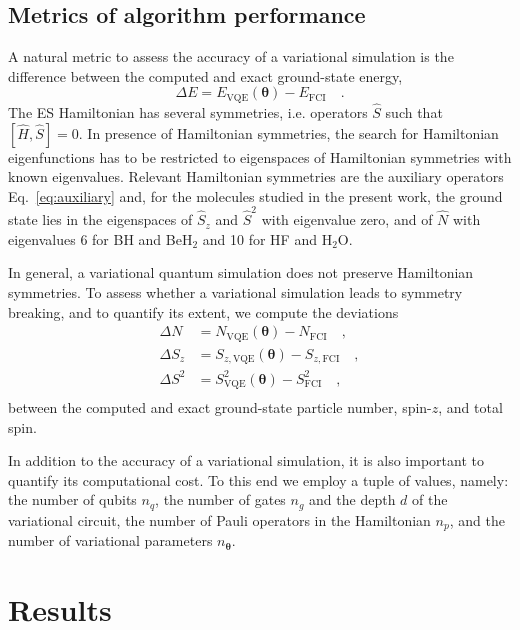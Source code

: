\documentclass[aps,pra,onecolumn]{revtex4-2}
\newcommand{\bgreek}[1]{{\boldsymbol{#1}}}
\begin{document}
\subsection{Metrics of algorithm performance}
\label{sec:metrics}

A natural metric to assess the accuracy of a variational simulation is the difference between the computed and exact ground-state energy, 
\begin{equation}
\Delta E = E_{\mathrm{VQE}}(\bgreek{\theta}) - E_{\mathrm{FCI}}
\quad .
\end{equation}
The ES Hamiltonian has several symmetries, i.e. operators $\hat{S}$ such that $[\hat{H},\hat{S}]=0$. 
In presence of Hamiltonian symmetries, the search for Hamiltonian eigenfunctions has to be restricted to eigenspaces of Hamiltonian symmetries with known eigenvalues.
Relevant Hamiltonian symmetries are the auxiliary operators Eq.~\eqref{eq:auxiliary}
and, for the molecules studied in the present work, the ground state lies in the eigenspaces of $\hat{S}_z$ and $\hat{S}^2$ with eigenvalue zero,
and of $\hat{N}$ with eigenvalues $6$ for BH and BeH$_2$ and 10 for HF and H$_2$O.

In general, a variational quantum simulation does not preserve Hamiltonian symmetries. To assess whether a variational simulation
leads to symmetry breaking, and to quantify its extent, we compute the deviations
\begin{equation}
\begin{split}
\Delta N &= N_{\mathrm{VQE}}(\bgreek{\theta}) - N_{\mathrm{FCI}} \quad, \\
\Delta S_z &= S_{z,\mathrm{VQE}}(\bgreek{\theta}) - S_{z,\mathrm{FCI}} \quad, \\
\Delta S^2 &= S^2_{\mathrm{VQE}}(\bgreek{\theta}) - S^2_{\mathrm{FCI}} \quad, \\
\end{split}
\end{equation}
between the computed and exact ground-state particle number, spin-$z$, and total spin.

In addition to the accuracy of a variational simulation, it is also important to quantify its computational cost. To this end we employ a tuple of values,
namely: 
the number of qubits $n_q$,  
the number of gates $n_g$ and the depth $d$ of the variational circuit, 
the number of Pauli operators in the Hamiltonian $n_p$, 
and the number of variational parameters $n_{\bgreek{\theta}}$.

\section{Results}
\label{sec:results}
\end{document}
